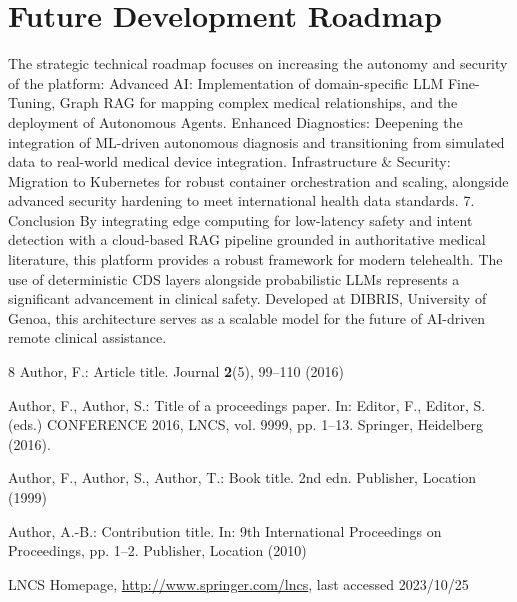 \documentclass[runningheads]{llncs}
\begin{document}
\section{Future Development Roadmap}
The strategic technical roadmap focuses on increasing the autonomy and security of the platform:
Advanced AI: Implementation of domain-specific LLM Fine-Tuning, Graph RAG for mapping complex medical relationships, and the deployment of Autonomous Agents.
Enhanced Diagnostics: Deepening the integration of ML-driven autonomous diagnosis and transitioning from simulated data to real-world medical device integration.
Infrastructure & Security: Migration to Kubernetes for robust container orchestration and scaling, alongside advanced security hardening to meet international health data standards.
7. Conclusion
By integrating edge computing for low-latency safety and intent detection with a cloud-based RAG pipeline grounded in authoritative medical literature, this platform provides a robust framework for modern telehealth. The use of deterministic CDS layers alongside probabilistic LLMs represents a significant advancement in clinical safety. Developed at DIBRIS, University of Genoa, this architecture serves as a scalable model for the future of AI-driven remote clinical assistance.
\begin{thebibliography}{8}
Author, F.: Article title. Journal \textbf{2}(5), 99--110 (2016)

Author, F., Author, S.: Title of a proceedings paper. In: Editor,
F., Editor, S. (eds.) CONFERENCE 2016, LNCS, vol. 9999, pp. 1--13.
Springer, Heidelberg (2016). 

Author, F., Author, S., Author, T.: Book title. 2nd edn. Publisher,
Location (1999)

Author, A.-B.: Contribution title. In: 9th International Proceedings
on Proceedings, pp. 1--2. Publisher, Location (2010)

LNCS Homepage, \url{http://www.springer.com/lncs}, last accessed 2023/10/25
\end{thebibliography}
\end{document}
